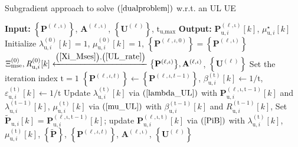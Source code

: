 \documentclass[9pt,journal]{IEEEtran}
\newcommand{\paren}[1]{\left({#1}\right)}
\newcommand{\bracket}[1]{{\left [{#1}\right ]}}
\newcommand{\braces}[1]{{\left\{ {#1}\right\}}}
\newcommand{\sfrac}[2]{#1/#2}
\theoremstyle{definition}
\begin{document}
\begin{algorithm}[ht!]
\caption{Subgradient approach to solve $\paren{\ref{dualproblem}}$ w.r.t. an UL UE}
\label{ULalgorithm}
\begin{algorithmic}[1]
\Statex \textbf{Input: } $\braces{\mathbf{P}^{\paren{\mathrm{\ell,\iota}}}}$,  $\mathbf{A}^{\paren{\mathrm{\ell,\iota}}}$, $\braces{\mathbf{U}^{\paren{\mathrm{\ell}}}}$, $\mathrm{t}_{\textrm{u,max}}$
\Statex \textbf{Output:} $\mathbf{P}^{\paren{\mathrm{\ell,\iota}}}_{\textrm{u},i}\bracket{k}$, $\mu^\star_{\textrm{u},i}\bracket{k}$
\State Initialize $\lambda^{\paren{\mathrm{0}}}_{\textrm{u},i}\bracket{k}=1$, $\mu^{\paren{\mathrm{0}}}_{\textrm{u},i}\bracket{k}=1$, $\braces{\mathbf{P}^{\paren{\ell,\iota,0}}}=\braces{\mathbf{P}^{\paren{\mathrm{\ell,\iota}}}}$ 
\State $\Xi^{\paren{\mathrm{0}}}_{\textrm{mse}},\mathit{R}^{\paren{\mathrm{0}}}_{\textrm{u},i}\bracket{k}\xleftarrow{\paren{\mathrm{\ref{Xi_Mses}}},\paren{\mathrm{\ref{UL_rate}}}}\braces{\mathbf{P}^{\paren{\mathrm{\ell,\iota}}}},\mathbf{A}^{\paren{\mathrm{\ell,\iota}}}$, $\braces{\mathbf{U}^{\paren{\mathrm{\ell}}}}$
\State Set the iteration index $\mathrm{t}=1$
\Repeat
\State $\braces{\mathbf{P}^{\paren{\ell,\iota,t}}}\leftarrow\braces{\mathbf{P}^{\paren{\ell,\iota,t-1}}}$, $\beta^{\paren{\mathrm{t}}}_{\textrm{u},i}\bracket{k}\leftarrow\sfrac{1}{\mathrm{t}}$, $\varepsilon^{\paren{\mathrm{t}}}_{\textrm{u},i}\bracket{k}\leftarrow\sfrac{1}{\mathrm{t}}$
\State Update $\lambda^{\paren{\mathrm{t}}}_{\textrm{u},i}\bracket{k}$ via $\mathrm{\paren{\ref{lambda_UL}}}$ with $\mathbf{P}^{\paren{\mathrm{\ell,\iota,t-1}}}_{\textrm{u},i}\bracket{k}$ and $\lambda^{\paren{\mathrm{t-1}}}_{\textrm{u},i}\bracket{k}$, $\mu^{\paren{\mathrm{t}}}_{\textrm{u},i}\bracket{k}$ via $\mathrm{\paren{\ref{mu_UL}}}$ with $\beta^{\paren{\mathrm{t-1}}}_{\textrm{u},i}\bracket{k}$ and $\mathit{R}^{\paren{\mathrm{t-1}}}_{\textrm{u},i}\bracket{k}$, 
\State Set $\widetilde{\mathbf{P}}_{\textrm{u},i}\bracket{k}$ = $\mathbf{P}^{\paren{\mathrm{\ell,\iota,t-1}}}_{\textrm{u},i}\bracket{k}$; update $\mathbf{P}^{\paren{\mathrm{\ell,\iota,t}}}_{\textrm{u},i}\bracket{k}$ via $\mathrm{\paren{\ref{PiB}}}$ with $\lambda^{\paren{\mathrm{t}}}_{\textrm{u},i}\bracket{k}$, $\mu^{\paren{\mathrm{t}}}_{\textrm{u},i}\bracket{k}$, $\braces{\widetilde{\mathbf{P}}}$, $\braces{\mathbf{P}^{\paren{\ell,\iota,t}}}$, $\mathbf{A}^{\paren{\mathrm{\ell,\iota}}}$, $\braces{\mathbf{U}^{\paren{\mathrm{\ell}}}}$

\end{algorithmic}
\end{algorithm}
\end{document}
